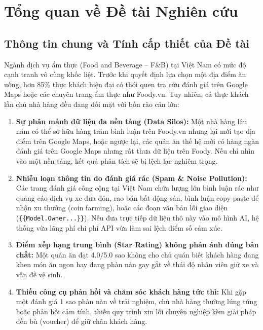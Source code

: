 \chapter{Tổng quan về Đề tài Nghiên cứu}

\section{Thông tin chung và Tính cấp thiết của Đề tài}
Ngành dịch vụ ẩm thực (Food and Beverage -- F\&B) tại Việt Nam có mức độ cạnh tranh vô cùng khốc liệt. Trước khi quyết định lựa chọn một địa điểm ăn uống, hơn 85\% thực khách hiện đại có thói quen tra cứu đánh giá trên Google Maps hoặc các chuyên trang ẩm thực như Foody.vn. Tuy nhiên, cả thực khách lẫn chủ nhà hàng đều đang đối mặt với bốn rào cản lớn:
\begin{enumerate}
    \item \textbf{Sự phân mảnh dữ liệu đa nền tảng (Data Silos):} Một nhà hàng lâu năm có thể sở hữu hàng trăm bình luận trên Foody.vn nhưng lại mới tạo địa điểm trên Google Maps, hoặc ngược lại, các quán ăn thế hệ mới có hàng ngàn đánh giá trên Google Maps nhưng rất thưa dữ liệu trên Foody. Nếu chỉ nhìn vào một nền tảng, kết quả phân tích sẽ bị lệch lạc nghiêm trọng.
    \item \textbf{Nhiễu loạn thông tin do đánh giá rác (Spam \& Noise Pollution):} Các trang đánh giá công cộng tại Việt Nam chứa lượng lớn bình luận rác như quảng cáo dịch vụ xe đưa đón, rao bán bất động sản, bình luận copy-paste để nhận xu thưởng (coin farming), hoặc các đoạn văn bản lỗi giao diện (\texttt{\{\{Model.Owner...\}\}}). Nếu đưa trực tiếp dữ liệu thô này vào mô hình AI, hệ thống vừa lãng phí chi phí API vừa làm sai lệch điểm số cảm xúc.
    \item \textbf{Điểm xếp hạng trung bình (Star Rating) không phản ánh đúng bản chất:} Một quán ăn đạt 4.0/5.0 sao không cho chủ quán biết khách hàng đang khen món ăn ngon hay đang phàn nàn gay gắt về thái độ nhân viên giữ xe và vấn đề vệ sinh.
    \item \textbf{Thiếu công cụ phản hồi và chăm sóc khách hàng tức thì:} Khi gặp một đánh giá 1 sao phàn nàn về trải nghiệm, chủ nhà hàng thường lúng túng hoặc phản hồi cảm tính, thiếu quy trình xin lỗi chuyên nghiệp kèm giải pháp đền bù (voucher) để giữ chân khách hàng.
\end{enumerate}

